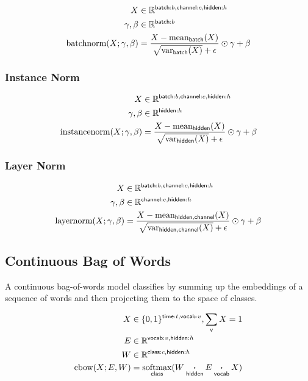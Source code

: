 \documentclass{article}
\newcommand{\name}[1]{\mathsf{#1}}
\newcommand{\ndot}[1]{\mathbin{\mathop{\thinspace\boldsymbol\cdot\thinspace}\displaylimits_{\name{#1}}}}
\newcommand{\nsum}[1]{\mathop{\sum}_{\name{#1}}}
\newcommand{\nfun}[2]{\mathop{\text{#2}}\displaylimits_{\name{#1}}}
\newcommand{\reals}{\mathbb{R}}
\begin{document}
\begin{align*} 
X &\in \reals^{{\name{batch}:b, \name{channel}:c, \name{hidden}:h}}\\
\gamma, \beta &\in \reals^{{\name{batch}:b}} \\
\text{batchnorm}(X; \gamma, \beta) &= \frac{X - \nfun{batch}{mean}(X)}{\sqrt{\nfun{batch}{var}(X)} + \epsilon } \odot \gamma + \beta
\end{align*}


\subsubsection*{Instance Norm}

\begin{align*} 
X &\in \reals^{{\name{batch}:b, \name{channel}:c, \name{hidden}:h}}\\
\gamma, \beta &\in \reals^{{\name{hidden}:h}} \\
\text{instancenorm}(X; \gamma, \beta) &= \frac{X - \nfun{hidden}{\text{mean}}(X)}{\sqrt{\nfun{hidden}{\text{var}}(X)} + \epsilon } \odot \gamma + \beta
\end{align*}

\subsubsection*{Layer Norm}

\begin{align*} 
X &\in \reals^{{\name{batch}:b, \name{channel}:c, \name{hidden}:h}} \\
\gamma, \beta &\in \reals^{{\name{channel}:c, \name{hidden}:h}} \\
\text{layernorm}(X; \gamma, \beta) &= \frac{X - \nfun{hidden,channel}{\text{mean}}(X)}{\sqrt{\nfun{hidden, channel}{\text{var}}(X)} + \epsilon } \odot \gamma + \beta 
\end{align*}


\subsection{Continuous Bag of Words}

A continuous bag-of-words model classifies by summing up the embeddings of a sequence of words and then projecting them to the space of classes. 

\begin{align*} 
X &\in \{0, 1\}^{{\name{time}:t, \name{vocab}:v}}, \nsum{v} X = 1\\
E &\in \reals^{{\name{vocab}:v, \name{hidden}:h}}\\
W &\in \reals^{{\name{class}:c, \name{hidden}:h}}\\
\text{cbow}(X; E, W) &= \nfun{class}{\text{softmax}} (W \ndot{hidden} E \ndot{vocab} X)
\end{align*}
\end{document}

